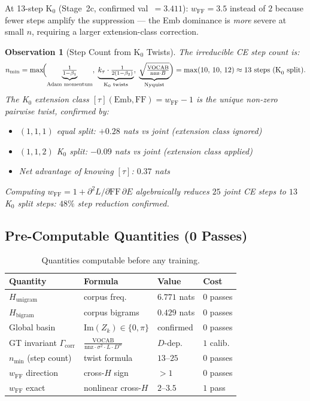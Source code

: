 \documentclass[11pt]{amsart}
\newtheorem{observation}[theorem]{Observation}
\begin{document}
At 13-step K$_0$ (Stage~2c, confirmed val~$=3.411$):
$w_\mathrm{FF}=3.5$ instead of $2$ because fewer steps amplify the suppression
--- the Emb dominance is \emph{more} severe at small $n$, requiring a
larger extension-class correction.

\begin{observation}[Step Count from K$_0$ Twists]
\label{thm:stepcount}
The irreducible CE step count is:
\[
  n_\mathrm{min} = \max\!\Bigl(
    \underbrace{\tfrac{1}{1-\beta_1}}_{\text{Adam momentum}},\;
    \underbrace{k_\tau \cdot \tfrac{1}{2(1-\beta_2)}}_{\text{K}_0\text{ twists}},\;
    \underbrace{\sqrt{\tfrac{\mathrm{VOCAB}}{\mathrm{nnz}\cdot B}}}_{\text{Nyquist}}
  \Bigr)
  = \max(10,\, 10,\, 12) \approx 13 \text{ steps (K}_0\text{ split)}.
\]
The K$_0$ extension class $[\tau](\mathrm{Emb},\mathrm{FF}) = w_\mathrm{FF}-1$
is the unique non-zero pairwise twist, confirmed by:
\begin{itemize}
  \item $(1,1,1)$ equal split: $+0.28$ nats vs joint (extension class ignored)
  \item $(1,1,2)$ K$_0$ split: $-0.09$ nats vs joint (extension class applied)
  \item Net advantage of knowing $[\tau]$: $0.37$ nats
\end{itemize}
Computing $w_\mathrm{FF} = 1 + \partial^2L/\partial\mathrm{FF}\,\partial E$
algebraically reduces $25$ joint CE steps to $13$ K$_0$ split steps:
$48\%$ step reduction confirmed.
\end{observation}

\subsection{Pre-Computable Quantities (0 Passes)}

\begin{table}[htbp]
\centering\small
\caption{Quantities computable before any training.}
\label{tab:precompute}
\begin{tabular}{llll}
\toprule
\textbf{Quantity} & \textbf{Formula} & \textbf{Value} & \textbf{Cost} \\
\midrule
$H_\mathrm{unigram}$        & corpus freq.\ & $6.771$ nats & $0$ passes \\
$H_\mathrm{bigram}$         & corpus bigrams & $0.429$ nats & $0$ passes \\
Global basin                 & $\mathrm{Im}(Z_k)\in\{0,\pi\}$ & confirmed & $0$ passes \\
GT invariant $\Gamma_\mathrm{corr}$ & $\frac{\mathrm{VOCAB}}{\mathrm{nnz}\cdot\sigma^2\cdot L\cdot D^\alpha}$ & $D$-dep. & $1$ calib. \\
$n_\mathrm{min}$ (step count) & twist formula & $13$--$25$ & $0$ passes \\
$w_\mathrm{FF}$ direction    & cross-$H$ sign & $>1$        & $0$ passes \\
$w_\mathrm{FF}$ exact        & nonlinear cross-$H$ & $2$--$3.5$ & $1$ pass \\
\bottomrule
\end{tabular}
\end{table}
\end{document}
